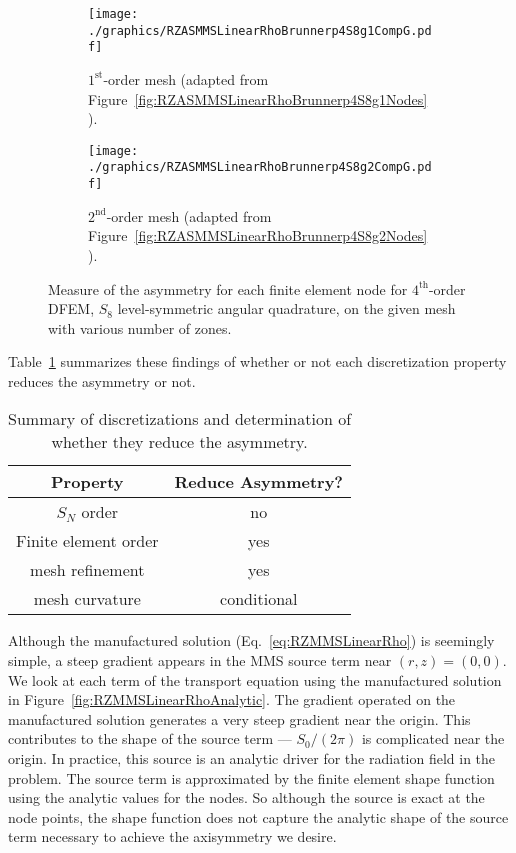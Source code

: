 \documentclass[12pt]{article}
\begin{document}
\begin{figure}[!htb]
\centering
\begin{subfigure}{0.48\textwidth}
\centering
\texttt{[image: ./graphics/RZASMMSLinearRhoBrunnerp4S8g1CompG.pdf]}
\caption{$1^\text{st}$-order mesh (adapted from Figure~\ref{fig:RZASMMSLinearRhoBrunnerp4S8g1Nodes}).}
\end{subfigure}%
\hspace{0.04\textwidth}%
\begin{subfigure}{0.48\textwidth}
\centering
\texttt{[image: ./graphics/RZASMMSLinearRhoBrunnerp4S8g2CompG.pdf]}
\caption{$2^\text{nd}$-order mesh (adapted from Figure~\ref{fig:RZASMMSLinearRhoBrunnerp4S8g2Nodes}).}
\end{subfigure}
\caption{Measure of the asymmetry for each finite element node for $4^\text{th}$-order DFEM, $S_8$ level-symmetric angular quadrature, on the given mesh with various number of zones.}
\label{fig:RZASMMSLinearRhoBrunnerp4S8NodesSymmetry}
\end{figure}

Table~\ref{tab:AxisymmetrySummary} summarizes these findings of whether or not each discretization property reduces the asymmetry or not.

\begin{table}[!htb]
\begin{tabular}{|c|c|}
\hline
Property & Reduce Asymmetry? \\\hline
$S_N$ order & no \\\hline
Finite element order & yes \\\hline
mesh refinement & yes \\\hline
mesh curvature & conditional \\\hline
\end{tabular}
\caption{Summary of discretizations and determination of whether they reduce the asymmetry.}
\label{tab:AxisymmetrySummary}
\end{table}

Although the manufactured solution (Eq.~\ref{eq:RZMMSLinearRho}) is seemingly simple, a steep gradient appears in the MMS source term near $(r,z)=(0,0)$. We look at each term of the transport equation using the manufactured solution in Figure~\ref{fig:RZMMSLinearRhoAnalytic}. The gradient operated on the manufactured solution generates a very steep gradient near the origin. This contributes to the shape of the source term --- $S_0/(2 \pi)$ is complicated near the origin. In practice, this source is an analytic driver for the radiation field in the problem. The source term is approximated by the finite element shape function using the analytic values for the nodes. So although the source is exact at the node points, the shape function does not capture the analytic shape of the source term necessary to achieve the axisymmetry we desire.
\end{document}
